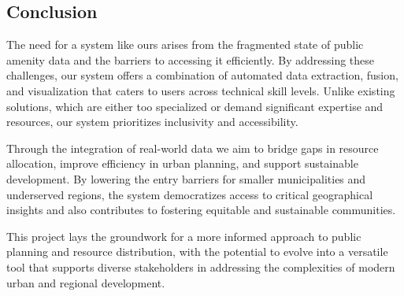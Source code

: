 \newpage{}

\subsection{Conclusion}

The need for a system like ours arises from the fragmented state of public
amenity data and the barriers to accessing it efficiently. By addressing these
challenges, our system offers a combination of automated data extraction,
fusion, and visualization that caters to users across technical skill levels.
Unlike existing solutions, which are either too specialized or demand
significant expertise and resources, our system prioritizes inclusivity and
accessibility.

Through the integration of real-world data we aim to bridge gaps in resource
allocation, improve efficiency in urban planning, and support sustainable
development. By lowering the entry barriers for smaller municipalities and
underserved regions, the system democratizes access to critical geographical
insights and also contributes to fostering equitable and sustainable
communities.

This project lays the groundwork for a more informed approach to public planning
and resource distribution, with the potential to evolve into a versatile tool
that supports diverse stakeholders in addressing the complexities of modern
urban and regional development.

\newpage{}